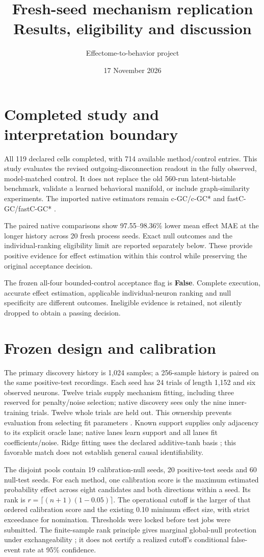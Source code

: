 \documentclass[11pt,a4paper]{article}
\title{Fresh-seed mechanism replication\\\large Results, eligibility and discussion}
\author{Effectome-to-behavior project}\date{17 November 2026}
\begin{document}
\maketitle
\section{Completed study and interpretation boundary}
All 119 declared cells completed, with 714 available method/control
entries. This study evaluates the revised outgoing-disconnection readout in the
fully observed, model-matched control. It does not replace the old 560-run
latent-bistable benchmark, validate a learned behavioral manifold, or include
graph-similarity experiments. The imported native estimators remain c-GC/c-GC*
and fastC-GC/fastC-GC* \citep{adedayo2025cgc,adedayo2026fastcgc}.

The paired native comparisons show 97.55--98.36\% lower mean effect MAE at the
longer history across 20 fresh process seeds. Exact null outcomes and the
individual-ranking eligibility limit are reported separately below. These provide
positive evidence for effect estimation within this control while preserving the
original acceptance decision.

The frozen all-four bounded-control acceptance flag is \textbf{False}.
Complete execution, accurate effect estimation, applicable individual-neuron
ranking and null specificity are different outcomes. Ineligible evidence is
retained, not silently dropped to obtain a passing decision.

\section{Frozen design and calibration}
The primary discovery history is 1,024 samples; a 256-sample history is paired on
the same positive-test recordings. Each seed has 24 trials of length 1,152 and six
observed neurons. Twelve trials supply mechanism fitting, including three reserved
for penalty/noise selection; native discovery sees only the nine inner-training
trials. Twelve whole trials are held out. This ownership prevents evaluation from
selecting fit parameters \citep{cawley2010overfitting}. Known support supplies only
adjacency to its explicit oracle lane; native lanes learn support and all lanes
fit coefficients/noise. Ridge fitting uses the declared additive-tanh basis
\citep{hoerl1970ridge,peters2014additive}; this favorable match does not establish
general causal identifiability.

The disjoint pools contain 19 calibration-null seeds, 20 positive-test
seeds and 60 null-test seeds. For each method, one calibration score is the
maximum estimated probability effect across eight candidates and both directions
within a seed. Its rank is $r=\lceil(n+1)(1-0.05)\rceil$. The operational cutoff
is the larger of that ordered calibration score and the existing 0.10 minimum
effect size, with strict exceedance for nomination. Thresholds were locked before
test jobs were submitted. The finite-sample rank principle gives marginal global-null
protection under exchangeability \citep{angelopoulos2021conformal}; it does not
certify a realized cutoff's conditional false-event rate at 95\% confidence.
\end{document}
